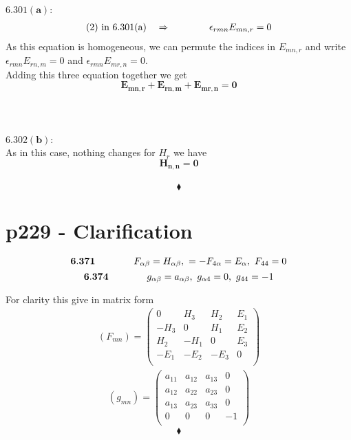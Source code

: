 \\\\
$\mathbf{6.301(a)}$:\\
\begin{align}
\text{(2) in 6.301(a)}\quad\Rightarrow \quad\quad\quad\quad \epsilon_{rmn}E_{mn,r}=0
\end{align}
As this equation is homogeneous, we can permute the indices in $E_{mn,r}$ and write $\epsilon_{rmn}E_{rn,m}=0$ and $\epsilon_{rmn}E_{mr,n}=0$.\\
Adding this three equation together we get 
$$\mathbf{E_{mn,r}+E_{rn,m}+E_{mr,n}=0}$$\\
\\\\
$\mathbf{6.302(b)}$:\\
As in this case, nothing changes for $H_r$ we have\\
$$\mathbf{H_{n,n}=0}$$\\
 $$\blacklozenge$$
 \newpage
 

\section{p229 - Clarification}
\begin{tcolorbox}
$$\mathbf{6.371}\quad\quad\quad\quad F_{\alpha\beta} = H_{\alpha\beta}, \ =-F_{4\alpha}=E_{\alpha}, \ F_{44}=0$$
$$\mathbf{6.374}\quad\quad\quad\quad g_{\alpha\beta} = a_{\alpha\beta}, \ g_{\alpha4}=0, \ g_{44}=-1$$
\end{tcolorbox}
For clarity this give in matrix form
\begin{align}
\left(F_{mn}\right)=\left(\begin{matrix}
0&H_3&H_2&E_1\\
-H_3&0&H_1&E_2\\
H_2&-H_1&0&E_3\\
-E_1&-E_2&-E_3&0\\
\end{matrix}\right)
\end{align}
\begin{align}
\left(g_{mn}\right)=\left(\begin{matrix}
a_{11}&a_{12}&a_{13}&0\\
a_{12}&a_{22}&a_{23}&0\\
a_{13}&a_{23}&a_{33}&0\\
0&0&0&-1\\
\end{matrix}\right)
\end{align}
 $$\blacklozenge$$
\newpage


